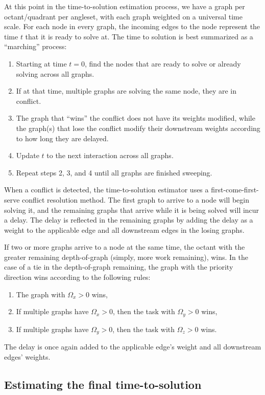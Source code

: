 At this point in the time-to-solution estimation process, we have a graph per octant/quadrant per angleset, with each graph weighted on a universal time scale.
For each node in every graph, the incoming edges to the node represent the time $t$ that it is ready to solve at.
The time to solution is best summarized as a ``marching'' process:
\begin{enumerate}
  \item Starting at time $t=0$, find the nodes that are ready to solve or already solving across all graphs.
  \item If at that time, multiple graphs are solving the same node, they are in conflict.
  \item The graph that ``wins'' the conflict does not have its weights modified, while the graph(s) that lose the conflict modify their downstream weights according to how long they are delayed.
  \item Update $t$ to the next interaction across all graphs.
  \item Repeat steps 2, 3, and 4 until all graphs are finished sweeping.
\end{enumerate}

When a conflict is detected, the time-to-solution estimator uses a first-come-first-serve conflict resolution method.
The first graph to arrive to a node will begin solving it, and the remaining graphs that arrive while it is being solved will incur a delay.
The delay is reflected in the remaining graphs by adding the delay as a weight to the applicable edge and all downstream edges in the losing graphs.

If two or more graphs arrive to a node at the same time, the octant with the greater remaining depth-of-graph (simply, more work remaining), wins.
In the case of a tie in the depth-of-graph remaining, the graph with the priority direction wins according to the following rules:
\begin{enumerate}
    \item The graph with $\Omega_x > 0$ wins,
	\item If multiple graphs have $\Omega_x > 0$, then the task with $\Omega_y > 0$ wins,
	\item If multiple graphs have $\Omega_y > 0$, then the task with $\Omega_z > 0$ wins.
\end{enumerate}
The delay is once again added to the applicable edge's weight and all downstream edges' weights.

\subsection{Estimating the final time-to-solution}

